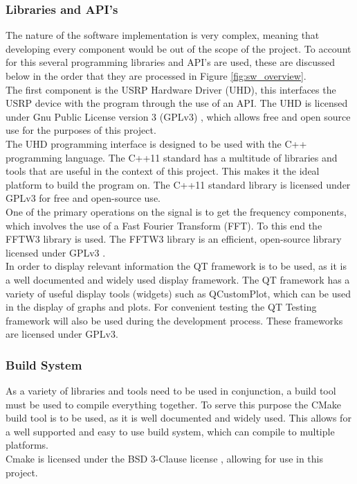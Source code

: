 \documentclass[10pt,twocolumn]{witseiepaper}
\begin{document}
		\subsubsection{Libraries and API's}
			The nature of the software implementation is very complex, meaning that developing every component would be out of the scope of the project. To account for this several programming libraries and API's are used, these are discussed below in the order that they are processed in Figure \ref{fig:sw_overview}.\\[10pt]
			The first component is the USRP Hardware Driver (UHD), this interfaces the USRP device with the program through the use of an API. The UHD is licensed under Gnu Public License version 3 (GPLv3) \cite{uhd_license}, which allows free and open source use for the purposes of this project.\\[10pt]
			The UHD programming interface is designed to be used with the C++ programming language. The C++11 standard has a multitude of libraries and tools that are useful in the context of this project. This makes it the ideal platform to build the program on. The C++11 standard library is licensed under GPLv3 for free and open-source use.\\[10pt]
			One of the primary operations on the signal is to get the frequency components, which involves the use of a Fast Fourier Transform (FFT). To this end the FFTW3 library is used. The FFTW3 library is an efficient, open-source library licensed under GPLv3 \cite{fftw3_license}.\\[10pt]
			In order to display relevant information the QT framework is to be used, as it is a well documented and widely used display framework. The QT framework has a variety of useful display tools (widgets) such as QCustomPlot, which can be used in the display of graphs and plots. For convenient testing the QT Testing framework will also be used during the development process. These frameworks are licensed under GPLv3.
			
		\subsubsection{Build System}
			As a variety of libraries and tools need to be used in conjunction, a build tool must be used to compile everything together. To serve this purpose the CMake build tool is to be used, as it is well documented and widely used. This allows for a well supported and easy to use build system, which can compile to multiple platforms. \\
			Cmake is licensed under the BSD 3-Clause license \cite{cmake_license}, allowing for use in this project.
\end{document}
